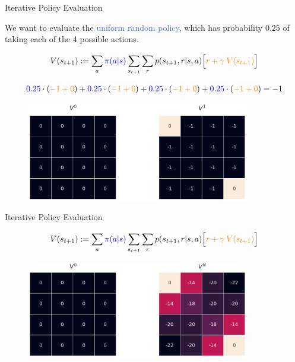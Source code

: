 \documentclass{beamer}
\begin{document}
\begin{frame}{Iterative Policy Evaluation}

\begin{small}

We want to evaluate the \textcolor{RoyalBlue}{uniform random policy}, which has probability $0.25$ of taking each of the 4 possible actions.

\begin{align*}
    V(s_{t+1}) := \sum_a \textcolor{blue}{\pi(a|s)} \sum_{s_{t+1}} \sum_r p(s_{t+1},r|s,a)\Big[\textcolor{orange}{r+\gamma\:V(s_{t+1})}\Big]
\end{align*}
\end{small}
\begin{footnotesize}
\begin{align*}
    \textcolor{blue}{0.25}\cdot(\textcolor{orange}{-1 + 0}) + \textcolor{blue}{0.25}\cdot(\textcolor{orange}{-1+0}) + \textcolor{blue}{0.25}\cdot(\textcolor{orange}{-1+0})+ \textcolor{blue}{0.25}\cdot(\textcolor{orange}{-1+0}) = -1
\end{align*}

\end{footnotesize}

\begin{figure}[t]
\includegraphics[width=9.7cm]{./images/step0.png}
\centering
\end{figure}

\end{frame}



\begin{frame}{Iterative Policy Evaluation}

\begin{small}
\begin{align*}
    V(s_{t+1}) := \sum_a \textcolor{blue}{\pi(a|s)} \sum_{s_{t+1}} \sum_r p(s_{t+1},r|s,a)\Big[\textcolor{orange}{r+\gamma\:V(s_{t+1})}\Big]
\end{align*}

\end{small}
\begin{figure}[t]
\includegraphics[width=9.7cm]{./images/stepn.png}
\centering
\end{figure}

\end{frame}
\end{document}
